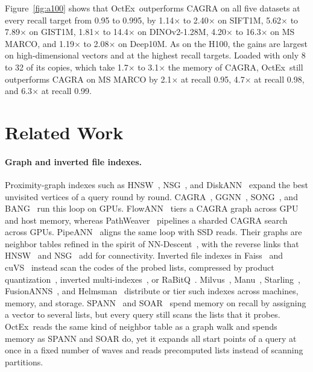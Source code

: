 \documentclass[letterpaper,twocolumn,10pt]{article}
\newcommand{\sysname}{OctEx}
\begin{document}
Figure~\ref{fig:a100} shows that \sysname\ outperforms CAGRA on all five datasets at every recall target from 0.95 to 0.995, by 1.14$\times$ to 2.40$\times$ on SIFT1M, 5.62$\times$ to 7.89$\times$ on GIST1M, 1.81$\times$ to 14.4$\times$ on DINOv2-1.28M, 4.20$\times$ to 16.3$\times$ on MS MARCO, and 1.19$\times$ to 2.08$\times$ on Deep10M. As on the H100, the gains are largest on high-dimensional vectors and at the highest recall targets. Loaded with only 8 to 32 of its copies, which take 1.7$\times$ to 3.1$\times$ the memory of CAGRA, \sysname\ still outperforms CAGRA on MS MARCO by 2.1$\times$ at recall 0.95, 4.7$\times$ at recall 0.98, and 6.3$\times$ at recall 0.99.

\section{Related Work}
\label{sec:related}

\paragraph{Graph and inverted file indexes.} Proximity-graph indexes such as HNSW~\cite{malkov2020hnsw}, NSG~\cite{fu2019nsg}, and DiskANN~\cite{subramanya2019diskann} expand the best unvisited vertices of a query round by round. CAGRA~\cite{ootomo2024cagra}, GGNN~\cite{groh2023ggnn}, SONG~\cite{zhao2020song}, and BANG~\cite{venkatasubba2025bang} run this loop on GPUs. FlowANN~\cite{zhao2026flowann} tiers a CAGRA graph across GPU and host memory, whereas PathWeaver~\cite{kim2025pathweaver} pipelines a sharded CAGRA search across GPUs. PipeANN~\cite{pipeann2025} aligns the same loop with SSD reads. Their graphs are neighbor tables refined in the spirit of NN-Descent~\cite{dong2011nndescent}, with the reverse links that HNSW~\cite{malkov2020hnsw} and NSG~\cite{fu2019nsg} add for connectivity. Inverted file indexes in Faiss~\cite{johnson2019faiss,douze2024faisslib} and cuVS~\cite{nvidia2025cuvs} instead scan the codes of the probed lists, compressed by product quantization~\cite{jegou2011pq,ge2013opq}, inverted multi-indexes~\cite{babenko2012imi}, or RaBitQ~\cite{gao2024rabitq,shi2026ivfrabitq}. Milvus~\cite{wang2021milvus}, Manu~\cite{guo2022manu}, Starling~\cite{wang2024starling}, FusionANNS~\cite{tian2025fusionanns}, and Helmsman~\cite{helmsman} distribute or tier such indexes across machines, memory, and storage. SPANN~\cite{chen2021spann} and SOAR~\cite{sun2023soar} spend memory on recall by assigning a vector to several lists, but every query still scans the lists that it probes. \sysname\ reads the same kind of neighbor table as a graph walk and spends memory as SPANN and SOAR do, yet it expands all start points of a query at once in a fixed number of waves and reads precomputed lists instead of scanning partitions.
\end{document}
